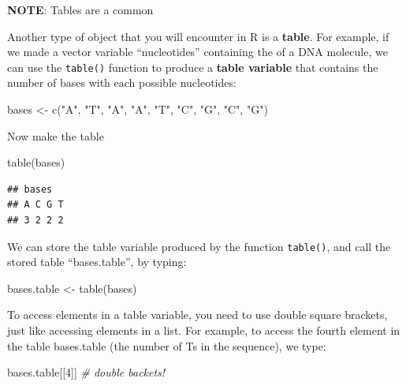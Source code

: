 \documentclass[
]{book}
\newenvironment{Shaded}{\begin{snugshade}}{\end{snugshade}}
\newcommand{\CommentTok}[1]{\textcolor[rgb]{0.56,0.35,0.01}{\textit{#1}}}
\newcommand{\DecValTok}[1]{\textcolor[rgb]{0.00,0.00,0.81}{#1}}
\newcommand{\FunctionTok}[1]{\textcolor[rgb]{0.00,0.00,0.00}{#1}}
\newcommand{\NormalTok}[1]{#1}
\newcommand{\OtherTok}[1]{\textcolor[rgb]{0.56,0.35,0.01}{#1}}
\newcommand{\StringTok}[1]{\textcolor[rgb]{0.31,0.60,0.02}{#1}}
\begin{document}
\textbf{NOTE}: Tables are a common

Another type of object that you will encounter in R is a \textbf{table}. For example, if we made a vector variable ``nucleotides'' containing the of a DNA molecule, we can use the \texttt{table()} function to produce a \textbf{table variable} that contains the number of bases with each possible nucleotides:

\begin{Shaded}
\begin{Highlighting}[]
\NormalTok{bases }\OtherTok{\textless{}{-}} \FunctionTok{c}\NormalTok{(}\StringTok{"A"}\NormalTok{, }\StringTok{"T"}\NormalTok{, }\StringTok{"A"}\NormalTok{, }\StringTok{"A"}\NormalTok{, }\StringTok{"T"}\NormalTok{, }\StringTok{"C"}\NormalTok{, }\StringTok{"G"}\NormalTok{, }\StringTok{"C"}\NormalTok{, }\StringTok{"G"}\NormalTok{)}
\end{Highlighting}
\end{Shaded}

Now make the table

\begin{Shaded}
\begin{Highlighting}[]
\FunctionTok{table}\NormalTok{(bases)}
\end{Highlighting}
\end{Shaded}

\begin{verbatim}
## bases
## A C G T 
## 3 2 2 2
\end{verbatim}

We can store the table variable produced by the function \texttt{table()}, and call the stored table ``bases.table'', by typing:

\begin{Shaded}
\begin{Highlighting}[]
\NormalTok{bases.table }\OtherTok{\textless{}{-}} \FunctionTok{table}\NormalTok{(bases)}
\end{Highlighting}
\end{Shaded}

To access elements in a table variable, you need to use double square brackets, just like accessing elements in a list. For example, to access the fourth element in the table bases.table (the number of Ts in the sequence), we type:

\begin{Shaded}
\begin{Highlighting}[]
\NormalTok{bases.table[[}\DecValTok{4}\NormalTok{]]  }\CommentTok{\# double backets!}
\end{Highlighting}
\end{Shaded}
\end{document}
